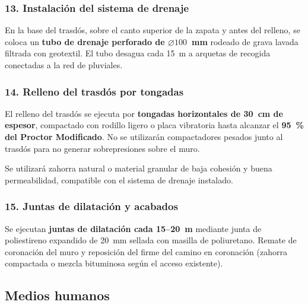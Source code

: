 \subsubsection*{13. Instalación del sistema de drenaje}

En la base del trasdós, sobre el canto superior de la zapata y antes del
relleno, se coloca un \textbf{tubo de drenaje perforado de $\varnothing 100$~mm}
rodeado de grava lavada filtrada con geotextil. El tubo desagua cada 15~m a
arquetas de recogida conectadas a la red de pluviales.

\subsubsection*{14. Relleno del trasdós por tongadas}

El relleno del trasdós se ejecuta por \textbf{tongadas horizontales de 30~cm
de espesor}, compactado con rodillo ligero o placa vibratoria hasta alcanzar
el \textbf{95~\% del Proctor Modificado}. No se utilizarán compactadores
pesados junto al trasdós para no generar sobrepresiones sobre el muro.

\begin{notabox}
  Se utilizará zahorra natural o material granular de baja cohesión y buena
  permeabilidad, compatible con el sistema de drenaje instalado.
\end{notabox}

\subsubsection*{15. Juntas de dilatación y acabados}

Se ejecutan \textbf{juntas de dilatación cada 15--20~m} mediante junta de
poliestireno expandido de 20~mm sellada con masilla de poliuretano.
Remate de coronación del muro y reposición del firme del camino en coronación
(zahorra compactada o mezcla bituminosa según el acceso existente).

\subsection{Medios humanos}
\label{subsec:medios_humanos}


